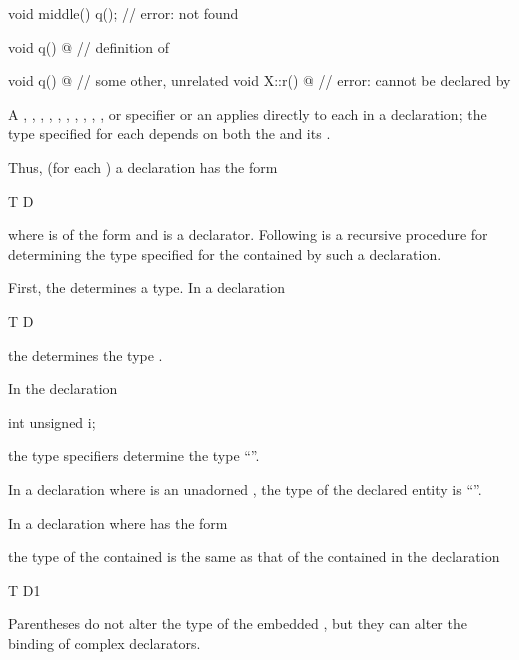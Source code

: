\begin{itemize}
\begin{example}
\begin{codeblock}
{  void middle() {
    q();                        // error:  not found
  }

  void q() { @\commentellip@ }        // definition of 
}

void q() { @\commentellip@ }          // some other, unrelated 
void X::r() { @\commentellip@ }       // error:  cannot be declared by 
\end{codeblock}
\end{example}
\end{itemize}

\pnum
A
,
,
,
,
,
,
,
,
,
,
or
specifier
or an 
applies directly to each 
in a declaration;
the type specified for each  depends on
both the  and its .

\pnum
Thus, (for each ) a declaration has the form
\begin{codeblock}
T D
\end{codeblock}
where
is of the form 
and
is a declarator.
Following is a recursive procedure for determining
the type specified for the contained
by such a declaration.

\pnum
First, the
determines a type.
In a declaration
\begin{codeblock}
T D
\end{codeblock}
the
determines the type
.
\begin{example}
In the declaration
\begin{codeblock}
int unsigned i;
\end{codeblock}
the type specifiers
determine the type
``''.
\end{example}

\pnum
In a declaration
where
is an unadorned ,
the type of the declared entity is
``''.

\pnum
In a declaration
where
has the form
\begin{ncsimplebnf}
\terminal{(}  \terminal{)}
\end{ncsimplebnf}
the type of the contained
is the same as that of the contained
in the declaration
\begin{codeblock}
T D1
\end{codeblock}
%
Parentheses do not alter the type of the embedded
,
but they can alter the binding of complex declarators.

